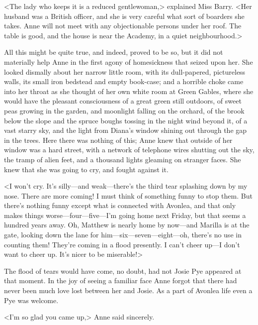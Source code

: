 <The lady who keeps it is a reduced gentlewoman,> explained Miss Barry. <Her husband was a British officer, and she is very careful what sort of boarders she takes. Anne will not meet with any objectionable persons under her roof. The table is good, and the house is near the Academy, in a quiet neighbourhood.>

All this might be quite true, and indeed, proved to be so, but it did not materially help Anne in the first agony of homesickness that seized upon her. She looked dismally about her narrow little room, with its dull-papered, pictureless walls, its small iron bedstead and empty book-case; and a horrible choke came into her throat as she thought of her own white room at Green Gables, where she would have the pleasant consciousness of a great green still outdoors, of sweet peas growing in the garden, and moonlight falling on the orchard, of the brook below the slope and the spruce boughs tossing in the night wind beyond it, of a vast starry sky, and the light from Diana's window shining out through the gap in the trees. Here there was nothing of this; Anne knew that outside of her window was a hard street, with a network of telephone wires shutting out the sky, the tramp of alien feet, and a thousand lights gleaming on stranger faces. She knew that she was going to cry, and fought against it.

<I won't cry. It's silly—and weak—there's the third tear splashing down by my nose. There are more coming! I must think of something funny to stop them. But there's nothing funny except what is connected with Avonlea, and that only makes things worse—four—five—I'm going home next Friday, but that seems a hundred years away. Oh, Matthew is nearly home by now—and Marilla is at the gate, looking down the lane for him—six—seven—eight—oh, there's no use in counting them! They're coming in a flood presently. I can't cheer up—I don't want to cheer up. It's nicer to be miserable!>

The flood of tears would have come, no doubt, had not Josie Pye appeared at that moment. In the joy of seeing a familiar face Anne forgot that there had never been much love lost between her and Josie. As a part of Avonlea life even a Pye was welcome.

<I'm so glad you came up,> Anne said sincerely.

